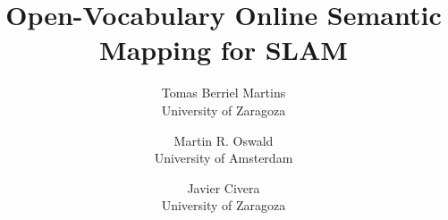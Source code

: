 \documentclass[letterpaper, 10 pt, conference]{ieeeconf}
\begin{document}
\author{Tomas Berriel Martins\\
University of Zaragoza
\and
Martin R. Oswald\\
University of Amsterdam\\
\and
Javier Civera\\
University of Zaragoza}
\title{Open-Vocabulary Online Semantic Mapping for SLAM}


\maketitle
    






{
    \small
    
    \balance
    
}
 
\end{document}
